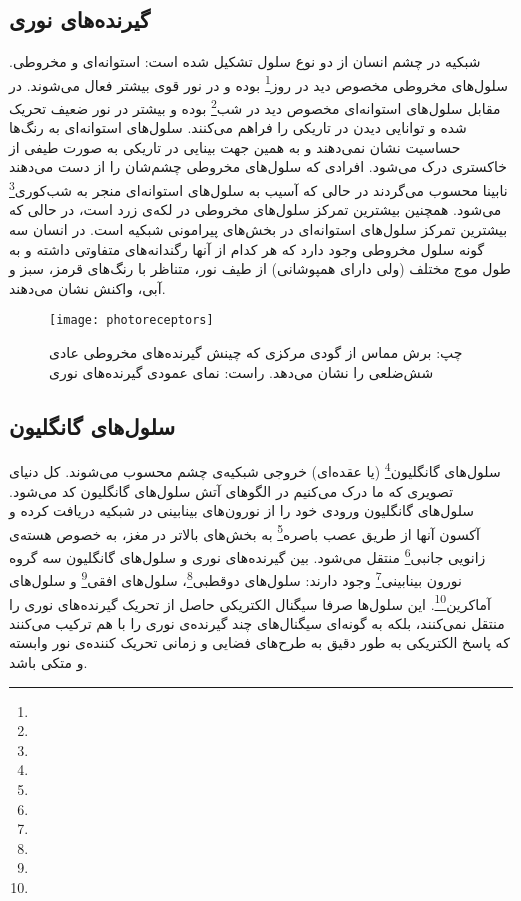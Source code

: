 \subsection{گیرنده‌های نوری}
شبکیه در چشم انسان از دو نوع سلول تشکیل شده است: استوانه‌ای و مخروطی. سلول‌های مخروطی مخصوص دید در روز\footnote{} بوده و در نور قوی بیشتر فعال می‌شوند. در مقابل سلول‌های استوانه‌ای مخصوص دید در شب\footnote{} بوده و بیشتر در نور ضعیف تحریک شده و توانایی دیدن در تاریکی را فراهم می‌کنند. سلول‌های استوانه‌ای به رنگ‌ها حساسیت نشان نمی‌دهند و به همین جهت بینایی در تاریکی به صورت طیفی از خاکستری درک می‌شود. افرادی که سلول‌های مخروطی چشم‌شان را از دست می‌دهند نابینا محسوب می‌گردند در حالی که آسیب به سلول‌های استوانه‌ای منجر به شب‌کوری\footnote{} می‌شود. همچنین بیشترین تمرکز سلول‌های مخروطی در لکه‌ی زرد است، در حالی که بیشترین تمرکز سلول‌های استوانه‌ای در بخش‌های پیرامونی شبکیه است. در انسان سه گونه سلول مخروطی وجود دارد که هر کدام از آنها رگندانه‌های متفاوتی داشته و به طول موج مختلف (ولی دارای همپوشانی) از طیف نور، متناظر با رنگ‌های قرمز، سبز و آبی، واکنش نشان می‌دهند. 

\begin{figure}
\centering
{\footnotesize
\texttt{[image: photoreceptors]}
\caption[گیرنده‌های نوری]{چپ: برش مماس از گودی مرکزی که چینش گیرنده‌های مخروطی عادی شش‌ضلعی را نشان می‌دهد.\cite{kolb20webvision}
راست: نمای عمودی گیرنده‌های نوری\cite{corenward}
}
\label{fig:photoreceptors}
}
\end{figure}

\subsection{سلول‌های گانگلیون}
سلول‌های گانگلیون\footnote{} (یا عقده‌ای) خروجی شبکیه‌ی چشم محسوب می‌شوند. کل دنیای تصویری که ما درک می‌کنیم در الگوهای آتش سلول‌های گانگلیون کد می‌شود. سلول‌های گانگلیون ورودی خود را از نورون‌های بینابینی در شبکیه دریافت کرده و آکسون آنها از طریق عصب باصره\footnote{} به بخش‌های بالاتر در مغز، به خصوص هسته‌ی زانویی جانبی\footnote{} منتقل می‌شود. بین گیرنده‌های نوری و سلول‌های گانگلیون سه گروه نورون بینابینی\footnote{} وجود دارند: سلول‌های دوقطبی\footnote{}، سلول‌های افقی\footnote{} و سلول‌های آماکرین\footnote{}. این سلول‌ها صرفا سیگنال الکتریکی حاصل از تحریک گیرنده‌های نوری را منتقل نمی‌کنند، بلکه به گونه‌ای سیگنال‌های چند گیرنده‌ی نوری را با هم ترکیب می‌کنند که پاسخ الکتریکی به طور دقیق به طرح‌های فضایی و زمانی تحریک کننده‌ی نور وابسته و متکی باشد. 

